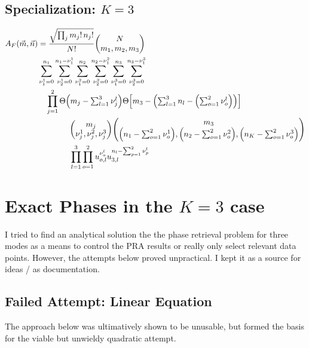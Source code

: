 \documentclass[
	english,
	a4paper,
	fontsize=10pt,
	parskip=half,
	titlepage=true,
	DIV=12,
	final
]{scrreprt}
\begin{document}
\section{Specialization: $K=3$}
\begin{align}
\nonumber
	A_F(\vec{m}, \vec{n})
&=
	\frac
		{\sqrt{\prod_j m_j! \, n_j!}}
		{N!}
	\mqty(
		N \\
		m_1, m_2, m_3
	) \\ 
\nonumber
&	\sum_{\nu_1^1 = 0}^{n_1}
	\sum_{\nu_2^1 = 0}^{n_1 - \nu_1^1}
	\sum_{\nu_1^2 = 0}^{n_2}
	\sum_{\nu_2^2 = 0}^{n_2 - \nu_1^2}
	\sum_{\nu_1^3 = 0}^{n_3}
	\sum_{\nu_2^3 = 0}^{n_3 - \nu_1^3} \\
\nonumber
&\quad
	\prod_{j=1}^{2}
		\Theta\qty(
			m_j -
			 {\textstyle \sum_{l=1}^{3} \nu_j^l}
		)
		\Theta\qty[
			m_3 - 
			{\textstyle \qty(\sum_{l=1}^3
				n_l - 
				\qty(
					\sum_{o=1}^2 \nu_o^l
				))
			}
		] \\
\nonumber
&\qquad\qquad
		\mqty(
			m_j \\
			\nu_j^1, \nu_j^2, \nu_j^3
		)
		\mqty(
			m_3 \\
			\qty(n_1 - {
				\textstyle \sum_{o=1}^2 \nu_o^1
			}),
			\qty(n_2 - {
				\textstyle \sum_{o=1}^2 \nu_o^2
			}),
			\qty(n_K - {
				\textstyle \sum_{o=1}^2 \nu_o^3
			})
		) \\
&\qquad\qquad
	\prod_{l=1}^3
	\prod_{o=1}^2
		u_{o,l}^{\nu_o^l}
		u_{3,l}^{n_l - \sum_{p=1}^2 \nu_p^l}
\end{align}


\chapter{Exact Phases in the $K=3$ case}
{\color{blue} I tried to find an analytical solution the the phase retrieval problem for three modes as a means to control the PRA results or really only select relevant data points. However, the attempts below proved unpractical. I kept it as a source for ideas / as documentation.}

\section{Failed Attempt: Linear Equation}
{\color{red} The approach below was ultimatively shown to be unusable, but formed the basis for the viable but unwieldy quadratic attempt.}
\end{document}

